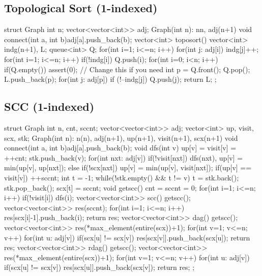 \subsection{Topological Sort (1-indexed)}
\begin{cpp}
struct Graph{
  int n; vector<vector<int>> adj;
  Graph(int n): n{n}, adj(n+1) {}
  void connect(int a, int b){adj[a].push_back(b);}
  vector<int> toposort(){
    vector<int> indg(n+1), L;
    queue<int> Q;
    for(int i=1; i<=n; i++) for(int j: adj[i]) indg[j]++;
    for(int i=1; i<=n; i++) if(!indg[i]) Q.push(i);
    for(int i=0; i<n; i++){
      if(Q.empty()) assert(0); // Change this if you need
      int p = Q.front(); Q.pop();
      L.push_back(p);
      for(int j: adj[p]) if (!--indg[j]) Q.push(j);
    }
    return L;
  }
};
\end{cpp}

\subsection{SCC (1-indexed)}
\begin{cpp}
struct Graph{
  int n, cnt, sccnt; vector<vector<int>> adj;
  vector<int> up, visit, scx, stk;
  Graph(int n): n(n), adj(n+1), up(n+1), visit(n+1), scx(n+1) {}
  void connect(int a, int b){adj[a].push_back(b);}
  void dfs(int v){
    up[v] = visit[v] = ++cnt;
    stk.push_back(v);
    for(int nxt: adj[v]){
      if(!visit[nxt]) dfs(nxt), up[v] = min(up[v], up[nxt]);
      else if(!scx[nxt]) up[v] = min(up[v], visit[nxt]);
    }
    if(up[v] == visit[v]){
      ++sccnt; int t = -1;
      while(!stk.empty() && t != v){
        t = stk.back(); stk.pop_back();
        scx[t] = sccnt;
      }
    }
  }
  void getscc(){
    cnt = sccnt = 0;
    for(int i=1; i<=n; i++) if(!visit[i]) dfs(i);
  }
  vector<vector<int>> scc(){
    getscc();
    vector<vector<int>> res(sccnt);
    for(int i=1; i<=n; i++) res[scx[i]-1].push_back(i);
    return res;
  }
  vector<vector<int>> dag(){
    getscc();
    vector<vector<int>> res(*max_element(entire(scx))+1);
    for(int v=1; v<=n; v++){
      for(int u: adj[v]) if(scx[u] != scx[v]) 
        res[scx[v]].push_back(scx[u]);
    }
    return res;
  }
  vector<vector<int>> rdag(){
    getscc();
    vector<vector<int>> res(*max_element(entire(scx))+1);
    for(int v=1; v<=n; v++){
      for(int u: adj[v]) if(scx[u] != scx[v]) 
        res[scx[u]].push_back(scx[v]);
    }
    return res;
  }
};
\end{cpp}

